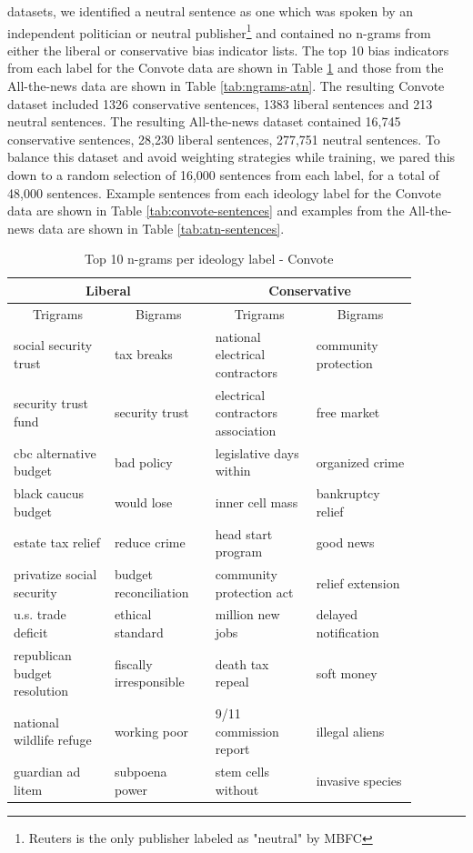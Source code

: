 \documentclass[10pt,a4paper,onecolumn]{article}
\begin{document}
datasets, we identified a neutral sentence as one which was spoken by an independent politician or neutral publisher\footnote{Reuters is the only publisher labeled as "neutral" by MBFC} and contained no n-grams from either the liberal or conservative bias indicator lists. The top 10 bias indicators from each label for the Convote data are shown in Table \ref{tab:ngrams-convote} and those from the All-the-news data are shown in Table \ref{tab:ngrams-atn}. The resulting Convote dataset included 1326 conservative sentences, 1383 liberal sentences and 213 neutral sentences. The resulting All-the-news dataset contained 16,745 conservative sentences, 28,230 liberal sentences, 277,751 neutral sentences. To balance this dataset and avoid weighting strategies while training, we pared this down to a random selection of 16,000 sentences from each label, for a total of 48,000 sentences. Example sentences from each ideology label for the Convote data are shown in Table \ref{tab:convote-sentences} and examples from the All-the-news data are shown in Table \ref{tab:atn-sentences}.

\begin{table}[h!]
	\begin{center}
		\caption{Top 10 n-grams per ideology label - Convote}
		\label{tab:ngrams-convote}
		\begin{tabular}{p{0.22\linewidth}|p{0.22\linewidth}|p{0.22\linewidth}|p{0.22\linewidth}}
			\hline\hline
			\multicolumn{2}{c|}{\textbf{Liberal}} & \multicolumn{2}{c|}{\textbf{Conservative}} \\
			\hline
			\multicolumn{1}{c|}{Trigrams} & \multicolumn{1}{c|}{Bigrams} & \multicolumn{1}{c|}{Trigrams} & \multicolumn{1}{c|}{Bigrams} \\
			\hline
			social security trust & tax breaks & national electrical contractors & community protection \\
			security trust fund & security trust & electrical contractors association & free market \\
			cbc alternative budget & bad policy & legislative days within & organized crime \\
			black caucus budget & would lose & inner cell mass & bankruptcy relief \\
			estate tax relief & reduce crime & head start program & good news \\
			privatize social security & budget reconciliation & community protection act & relief extension \\
			u.s. trade deficit & ethical standard & million new jobs & delayed notification \\
			republican budget resolution & fiscally irresponsible & death tax repeal & soft money \\
			national wildlife refuge & working poor & 9/11 commission report & illegal aliens \\
			guardian ad litem & subpoena power & stem cells without & invasive species \\
			\hline\hline
		\end{tabular}
	\end{center}
\end{table}
\end{document}
